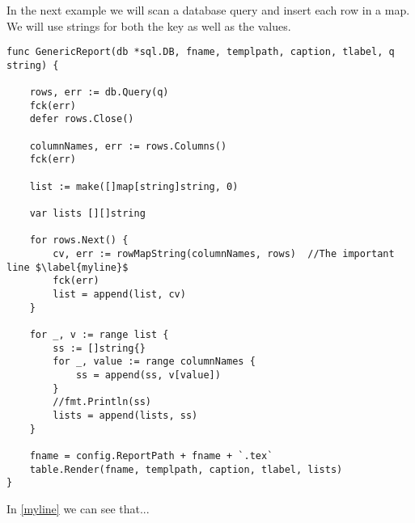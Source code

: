 In the next example we will scan a database query and insert each row in a map. We will use strings for both the key as well as the values.

\begin{verbatim}
func GenericReport(db *sql.DB, fname, templpath, caption, tlabel, q string) {

	rows, err := db.Query(q)
	fck(err)
	defer rows.Close()

	columnNames, err := rows.Columns()
	fck(err)
	
	list := make([]map[string]string, 0)
	
	var lists [][]string

	for rows.Next() {
		cv, err := rowMapString(columnNames, rows)  //The important line $\label{myline}$
		fck(err)
		list = append(list, cv)
	}

	for _, v := range list {
		ss := []string{}
		for _, value := range columnNames {
			ss = append(ss, v[value])
		}
		//fmt.Println(ss)
		lists = append(lists, ss)
	}

	fname = config.ReportPath + fname + `.tex`
	table.Render(fname, templpath, caption, tlabel, lists)
}
\end{verbatim}


In \ref{myline} we can see that...






